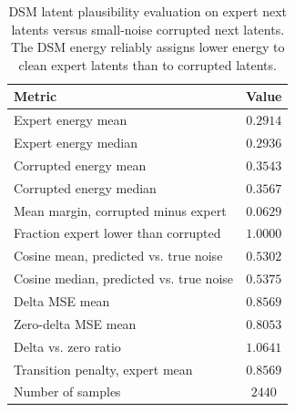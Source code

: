 \begin{table}[h!]
\centering
\small
\caption{DSM latent plausibility evaluation on expert next latents versus small-noise corrupted next latents. 
The DSM energy reliably assigns lower energy to clean expert latents than to corrupted latents.}
\label{tab:dsm_latent_plausibility}
\begin{tabular}{lc}
\toprule
Metric & Value \\
\midrule
Expert energy mean & \(0.2914\) \\
Expert energy median & \(0.2936\) \\
Corrupted energy mean & \(0.3543\) \\
Corrupted energy median & \(0.3567\) \\
Mean margin, corrupted minus expert & \(0.0629\) \\
Fraction expert lower than corrupted & \(1.0000\) \\
Cosine mean, predicted vs. true noise & \(0.5302\) \\
Cosine median, predicted vs. true noise & \(0.5375\) \\
Delta MSE mean & \(0.8569\) \\
Zero-delta MSE mean & \(0.8053\) \\
Delta vs. zero ratio & \(1.0641\) \\
Transition penalty, expert mean & \(0.8569\) \\
Number of samples & \(2440\) \\
\bottomrule
\end{tabular}
\end{table}

